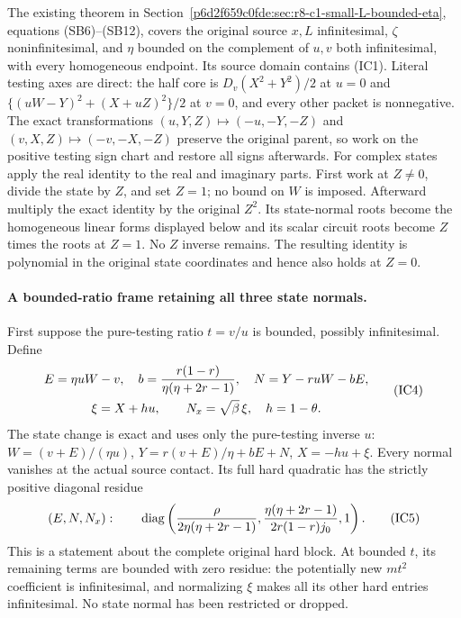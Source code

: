 The existing theorem in Section~\ref{p6d2f659c0fde:sec:r8-c1-small-L-bounded-eta},
equations (SB6)--(SB12), covers the original source $x,L$ infinitesimal,
$\zeta$ noninfinitesimal, and $\eta$ bounded on the complement of
$u,v$ both infinitesimal, with every homogeneous endpoint. Its source
domain contains (IC1). Literal testing axes are direct: the half core
is $D_v(X^2+Y^2)/2$ at $u=0$ and
$\{(uW-Y)^2+(X+uZ)^2\}/2$ at $v=0$, and every other packet is
nonnegative. The exact transformations
$(u,Y,Z)\mapsto(-u,-Y,-Z)$ and
$(v,X,Z)\mapsto(-v,-X,-Z)$ preserve the original parent, so work on
the positive testing sign chart and restore all signs afterwards.
For complex states apply the real identity to the real and imaginary
parts. First work at $Z\ne0$, divide the state by $Z$, and set $Z=1$;
no bound on $W$ is imposed. Afterward multiply the exact identity by
the original $Z^2$. Its state-normal roots become the homogeneous
linear forms displayed below and its scalar circuit roots become
$Z$ times the roots at $Z=1$. No $Z$ inverse remains. The resulting
identity is polynomial in the original state coordinates and hence
also holds at $Z=0$.

\paragraph{A bounded-ratio frame retaining all three state normals.}
First suppose the pure-testing ratio $t=v/u$ is bounded, possibly
infinitesimal. Define
\[
 \begin{gathered}
 E=\eta uW-v,\quad
 b={r(1-r)\over\eta(\eta+2r-1)},\quad
 N=Y-ruW-bE,\\
 \xi=X+hu,\qquad N_x=\sqrt\beta\,\xi,\quad h=1-\theta.
                                                               \end{gathered} \tag{IC4}
\]
The state change is exact and uses only the pure-testing inverse $u$:
$W=(v+E)/(\eta u)$, $Y=r(v+E)/\eta+bE+N$, $X=-hu+\xi$.
Every normal vanishes at the actual source contact. Its full hard
quadratic has the strictly positive diagonal residue
\[
 (E,N,N_x):\qquad
 \operatorname{diag}\left(
 {\rho\over2\eta(\eta+2r-1)},
 {\eta(\eta+2r-1)\over2r(1-r)j_0},1\right).             \tag{IC5}
\]
This is a statement about the complete original hard block. At bounded
$t$, its remaining terms are bounded with zero residue: the potentially
new $m t^2$ coefficient is infinitesimal, and normalizing $\xi$ makes
all its other hard entries infinitesimal. No state normal has been
restricted or dropped.

